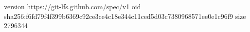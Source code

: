 version https://git-lfs.github.com/spec/v1
oid sha256:f6fd79f4f399b6369c92ce3ce4c18e344c11ced5d03c7380968571ee0e1c96f9
size 2796344
